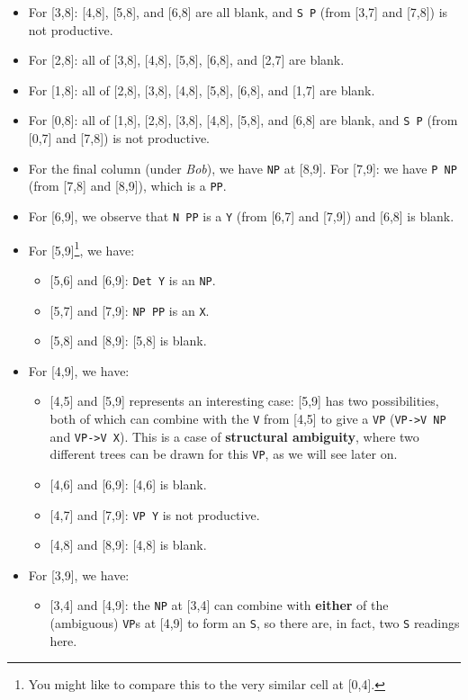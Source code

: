 \documentclass[a4paper]{article}
\begin{document}
\begin{enumerate}
\begin{enumerate}
\begin{enumerate}
\begin{itemize}
\item For [3,8]: [4,8], [5,8], and [6,8] are all blank, and \texttt{S P} (from [3,7] and [7,8]) is not productive.
\item For [2,8]: all of [3,8], [4,8], [5,8], [6,8], and [2,7] are blank.
\item For [1,8]: all of [2,8], [3,8], [4,8], [5,8], [6,8], and [1,7] are blank.
\item For [0,8]: all of [1,8], [2,8], [3,8], [4,8], [5,8], and [6,8] are blank, and \texttt{S P} (from [0,7] and [7,8]) is not productive.
\item For the final column (under \textit{Bob}), we have \texttt{NP} at [8,9]. For [7,9]: we have \texttt{P NP} (from [7,8] and [8,9]), which is a \texttt{PP}.
\item For [6,9], we observe that \texttt{N PP} is a \texttt{Y} (from [6,7] and [7,9]) and [6,8] is blank.
\item For [5,9]\footnote{You might like to compare this to the very similar cell at [0,4].}, we have:
\begin{itemize}
\item{} [5,6] and [6,9]: \texttt{Det Y} is an \texttt{NP}.
\item{} [5,7] and [7,9]: \texttt{NP PP} is an \texttt{X}.
\item{} [5,8] and [8,9]: [5,8] is blank.
\end{itemize}
\item For [4,9], we have:
\begin{itemize}
\item{} [4,5] and [5,9] represents an interesting case: [5,9] has two possibilities, both of which can combine with the \texttt{V} from [4,5] to give a \texttt{VP} (\texttt{VP->V NP} and \texttt{VP->V X}). This is a case of \textbf{structural ambiguity}, where two different trees can be drawn for this \texttt{VP}, as we will see later on.
\item{} [4,6] and [6,9]: [4,6] is blank.
\item{} [4,7] and [7,9]: \texttt{VP Y} is not productive.
\item{} [4,8] and [8,9]: [4,8] is blank.
\end{itemize}
\item For [3,9], we have:
\begin{itemize}
\item{} [3,4] and [4,9]: the \texttt{NP} at [3,4] can combine with \textbf{either} of the (ambiguous) \texttt{VP}s at [4,9] to form an \texttt{S}, so there are, in fact, two \texttt{S} readings here.

\end{itemize}
\end{itemize}
\end{enumerate}
\end{enumerate}
\end{enumerate}
\end{document}
